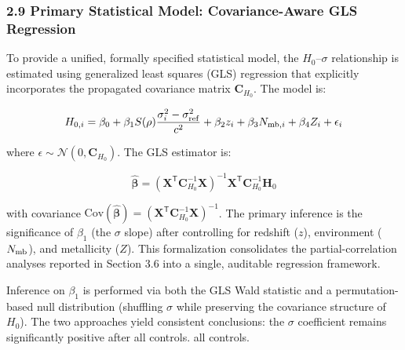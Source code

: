 \documentclass[
]{article}
\begin{document}
\subsubsection{2.9 Primary Statistical Model: Covariance-Aware GLS
Regression}\label{primary-statistical-model-covariance-aware-gls-regression}

To provide a unified, formally specified statistical model, the
\(H_0\)--\(\sigma\) relationship is estimated using generalized least
squares (GLS) regression that explicitly incorporates the propagated
covariance matrix \(\mathbf{C}_{H_0}\). The model is:

\begin{equation}
H_{0,i} = \beta_0 + \beta_1 S(\rho) \frac{\sigma_i^2 - \sigma_{\rm ref}^2}{c^2} + \beta_2 z_i + \beta_3 N_{{\rm mb},i} + \beta_4 Z_i + \epsilon_i
\label{eq:gls_model}
\end{equation}

where \(\epsilon \sim \mathcal{N}(0, \mathbf{C}_{H_0})\). The GLS
estimator is:

\begin{equation}
\hat{\boldsymbol{\beta}} = (\mathbf{X}^\mathsf{T} \mathbf{C}_{H_0}^{-1} \mathbf{X})^{-1} \mathbf{X}^\mathsf{T} \mathbf{C}_{H_0}^{-1} \mathbf{H}_0
\end{equation}

with covariance \(\mathrm{Cov}(\hat{\boldsymbol{\beta}}) =
(\mathbf{X}^\mathsf{T} \mathbf{C}_{H_0}^{-1} \mathbf{X})^{-1}\). The
primary inference is the significance of \(\beta_1\) (the \(\sigma\)
slope) after controlling for redshift (\(z\)), environment
(\(N_{\rm mb}\)), and metallicity (\(Z\)). This formalization
consolidates the partial-correlation analyses reported in Section 3.6
into a single, auditable regression framework.

Inference on \(\beta_1\) is performed via both the GLS Wald statistic
and a permutation-based null distribution (shuffling \(\sigma\) while
preserving the covariance structure of \(H_0\)). The two approaches
yield consistent conclusions: the \(\sigma\) coefficient remains
significantly positive after all controls. all controls.
\end{document}
